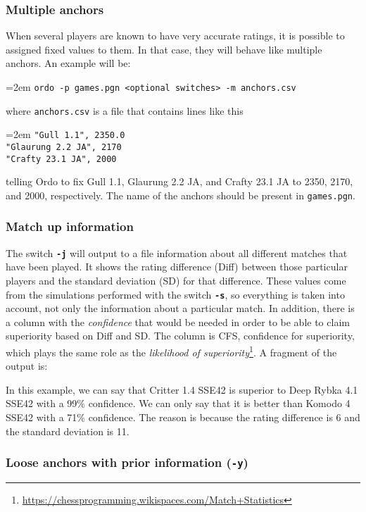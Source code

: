 \documentclass[12pt]{article}
\newcommand{\swtch} [1] {\texttt{\textbf{#1}}}
\newcommand{\filename} [1] {\texttt{#1}}
\newcommand{\cmdln}[1]{
	\par
	\begingroup
		\leftskip=2em
		\addtolength{\rightskip}{0em}
		\noindent \small{\texttt{#1}}
		\par
	\endgroup
}
\newcommand{\inctxt}[1]{
	\begingroup
    \fontsize{9pt}{11pt}\selectfont
		 
	\endgroup
}
\begin{document}
\subsubsection*{Multiple anchors}

When several players are known to have very accurate ratings, it is possible to assigned fixed values to them.
In that case, they will behave like multiple anchors. An example will be:

\cmdln{ordo -p games.pgn <optional switches> -m anchors.csv}

where \filename{anchors.csv} is a file that contains lines like this

\cmdln{"Gull 1.1", 2350.0\\
"Glaurung 2.2 JA", 2170\\
"Crafty 23.1 JA", 2000}

telling Ordo to fix Gull 1.1, Glaurung 2.2 JA, and Crafty 23.1 JA to 2350, 2170, and 2000, respectively.
The name of the anchors should be present in \filename{games.pgn}.

\subsubsection*{Match up information}

The switch \swtch{-j} will output to a file information about all different matches that have been played.
It shows the rating difference (Diff) between those particular players and the standard deviation (SD) for that difference.
These values come from the simulations performed with the switch \swtch{-s}, so everything is taken into account, not only the information about a particular match.
In addition, there is a column with the \textit{confidence} that would be needed in order to be able to claim superiority based on Diff and SD. 
The column is CFS, confidence for superiority, which plays the same role as the \textit{likelihood of superiority}\footnote{\url{https://chessprogramming.wikispaces.com/Match+Statistics}}.
A fragment of the output is:

\inctxt{readme-example-j-switch.txt}
In this example, we can say that Critter 1.4 SSE42 is superior to Deep Rybka 4.1 SSE42 with a 99\% confidence. We can only say that it is better than Komodo 4 SSE42 with a 71\% confidence. The reason is because the rating difference is 6 and the standard deviation is 11.


\subsubsection*{Loose anchors with prior information (\swtch{-y})}
\end{document}
